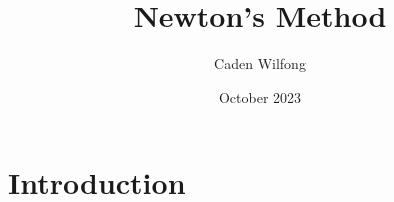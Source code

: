 \documentclass{article}
\title{Newton's Method}
\author{Caden Wilfong}
\date{October 2023}
\begin{document}
\maketitle

\section{Introduction}
\end{document}
